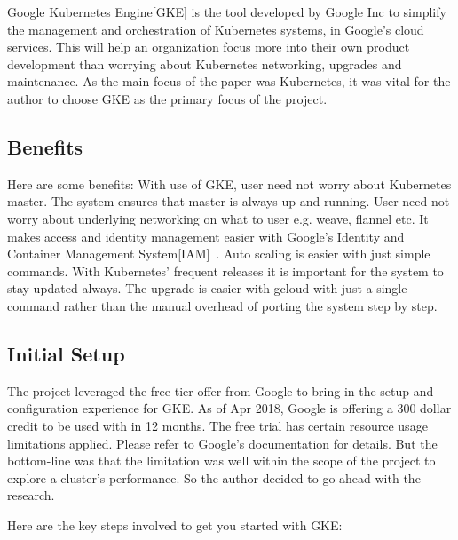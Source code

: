 Google Kubernetes Engine[GKE] is the tool developed by Google Inc to simplify
the management and orchestration of Kubernetes systems, in Google's cloud
services. This will help an organization focus more into their own product
development than worrying about Kubernetes networking, upgrades and
maintenance. As the main focus of the paper was Kubernetes, it was vital for
the author to choose GKE as the primary focus of the project.



\subsection{Benefits}

Here are some benefits: With use of GKE, user need not worry about Kubernetes
master. The system ensures that master is always up and running. User need not
worry about underlying networking on what to user e.g. weave, flannel etc.  It
makes access and identity management easier with Google's Identity and
Container Management System[IAM]~\cite{hid-sp18-417-IAM}. Auto scaling is
easier with just simple commands. With Kubernetes' frequent releases it is
important for the system to stay updated always. The upgrade is easier with
gcloud with just a single command rather than the manual overhead of porting
the system step by step.

\subsection{Initial Setup}

The project leveraged the free tier offer from Google to bring in the setup
and configuration experience for GKE. As of Apr 2018, Google is offering a 300
dollar credit to be used with in 12 months. The free trial has certain
resource usage limitations applied. Please refer to Google's documentation for
details. But the bottom-line was that the limitation was well within the scope
of the project to explore a cluster's performance. So the author decided to go
ahead with the research.

Here are the key steps involved to get you started with GKE:

